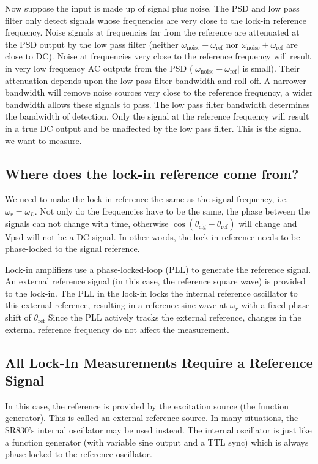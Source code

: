 \documentclass{../lab}
\begin{document}
Now suppose the input is made up of signal plus noise. The PSD and low pass filter only detect signals whose frequencies are very close to the lock-in reference frequency. Noise signals at frequencies far from the reference are attenuated at the PSD output by the low pass filter (neither $\omega_\text{noise} - \omega_\text{ref}$ nor $\omega_\text{noise} + \omega_\text{ref}$ are close to DC). Noise at frequencies very close to the reference frequency will result in very low frequency AC outputs from the PSD ($|\omega_\text{noise} - \omega_\text{ref}|$ is small). Their attenuation depends upon the low pass filter bandwidth and roll-off. A narrower bandwidth will remove noise sources very close to the reference frequency, a wider bandwidth allows these signals to pass. The low pass filter bandwidth determines the bandwidth of detection. Only the signal at the reference frequency will result in a true DC output and be unaffected by the low pass filter. This is the signal we want to measure.

\subsection{Where does the lock-in reference come from?}

We need to make the lock-in reference the same as the signal frequency, i.e. $\omega_r = \omega_L$. Not only do the frequencies have to be the same, the phase between the signals can not change with time, otherwise $\cos(\theta_\text{sig} - \theta_\text{ref})$ will change and Vpsd will not be a DC signal. In other words, the lock-in reference needs to be phase-locked to the signal reference.

Lock-in amplifiers use a phase-locked-loop (PLL) to generate the reference signal. An external reference signal (in this case, the reference square wave) is provided to the lock-in. The PLL in the lock-in locks the internal reference oscillator to this external reference, resulting in a reference sine wave at $\omega_r $ with a fixed phase shift of $\theta_\text{ref}$ Since the PLL actively tracks the external reference, changes in the external reference frequency do not affect the measurement.

\newpage

\subsection{All Lock-In Measurements Require a Reference Signal}

In this case, the reference is provided by the excitation source (the function generator). This is called an external reference source. In many situations, the SR830's internal oscillator may be used instead. The internal oscillator is just like a function generator (with variable sine output and a TTL sync) which is always phase-locked to the reference oscillator.
\end{document}
